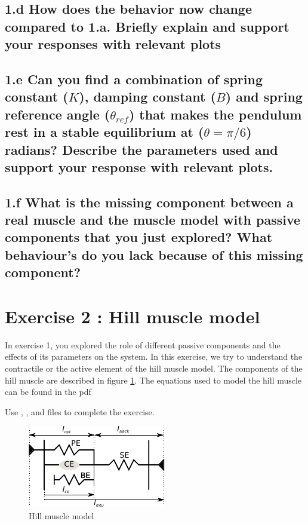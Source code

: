 \documentclass{cmc}
\begin{document}
\subsection*{1.d How does the behavior now change compared to
  1.a. Briefly explain and support your responses with relevant plots}

\subsection*{1.e Can you find a combination of spring constant ($K$),
  damping constant ($B$) and spring reference angle ($\theta_{ref}$) that
  makes the pendulum rest in a stable equilibrium at
  ($\theta = \pi/6$) radians? Describe the parameters used and support
  your response with relevant plots.}

\subsection*{1.f What is the missing component between a real muscle
  and the muscle model with passive components that you just
  explored? What behaviour's do you lack because of this missing component?}


\newpage
\section*{Exercise 2 : Hill muscle model}
\label{sec:question-2}

In exercise 1, you explored the role of different passive components
and the effects of its parameters on the system. In this exercise, we
try to understand the contractile or the active element of the hill
muscle model. The components of the hill muscle are described in
figure \ref{fig:hill_muscle}. The equations used to model the hill
muscle can be found in the pdf 


Use , ,
 and  files to
complete the exercise.

\begin{figure}[H]
  \centering \includegraphics[scale=2.5]{figures/hill_muscle}
  \caption{Hill muscle model}
  \label{fig:hill_muscle}
\end{figure}
\end{document}

